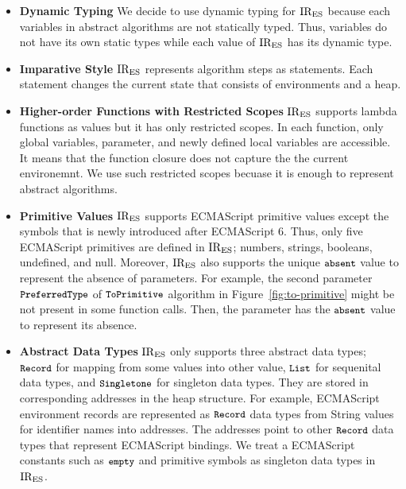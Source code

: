 \begin{itemize}
\item \textbf{Dynamic Typing} We decide to use dynamic typing for \( \text{IR}_\text{ES} \)
because each variables in abstract algorithms are not statically typed.
Thus, variables do not have its own static types while each value of \( \text{IR}_\text{ES} \)
has its dynamic type.

\item \textbf{Imparative Style} \( \text{IR}_\text{ES} \) represents algorithm steps
as statements. Each statement changes the current state
that consists of environments and a heap.

\item \textbf{Higher-order Functions with Restricted Scopes} \( \text{IR}_\text{ES} \) supports
lambda functions as values but it has only restricted scopes. In each function,
only global variables, parameter, and newly defined local variables are accessible.
It means that the function closure does not capture the the current environemnt.
We use such restricted scopes becuase it is enough to represent abstract algorithms.

\item \textbf{Primitive Values} \( \text{IR}_\text{ES} \) supports ECMAScript primitive values except
the symbols that is newly introduced after ECMAScript 6. Thus, only five ECMAScript primitives
are defined in \( \text{IR}_\text{ES} \); numbers, strings, booleans, undefined, and null.
Moreover, \( \text{IR}_\text{ES} \) also supports the unique \( \texttt{\small absent} \) value to represent
the absence of parameters. For example, the second parameter \( \texttt{\small PreferredType} \)
of \( \texttt{\small ToPrimitive} \) algorithm in Figure~\ref{fig:to-primitive} might be
not present in some function calls. Then, the parameter has the \( \texttt{\small absent} \) value
to represent its absence.

\item \textbf{Abstract Data Types} \( \text{IR}_\text{ES} \) only supports three abstract data types;
\( \texttt{\small Record} \) for mapping from some values into other value,
\( \texttt{\small List} \) for sequenital data types,
and \( \texttt{\small Singletone} \) for singleton data types.
They are stored in corresponding addresses in the heap structure.
For example, ECMAScript environment records are represented as \( \texttt{\small Record} \) data types
from String values for identifier names into addresses.
The addresses point to other \( \texttt{\small Record} \) data types that represent ECMAScript bindings.
We treat a ECMAScript constants such as \( \texttt{\small empty} \) and primitive symbols as singleton
data types in \( \text{IR}_\text{ES} \).
\end{itemize}


